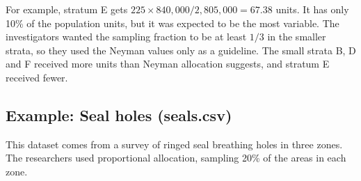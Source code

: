 \documentclass[
  letterpaper,
  DIV=11,
  numbers=noendperiod]{scrreprt}
\newenvironment{Shaded}{\begin{snugshade}}{\end{snugshade}}
\newcommand{\AttributeTok}[1]{\textcolor[rgb]{0.40,0.45,0.13}{#1}}
\newcommand{\CommentTok}[1]{\textcolor[rgb]{0.37,0.37,0.37}{#1}}
\newcommand{\DecValTok}[1]{\textcolor[rgb]{0.68,0.00,0.00}{#1}}
\newcommand{\DocumentationTok}[1]{\textcolor[rgb]{0.37,0.37,0.37}{\textit{#1}}}
\newcommand{\FunctionTok}[1]{\textcolor[rgb]{0.28,0.35,0.67}{#1}}
\newcommand{\NormalTok}[1]{\textcolor[rgb]{0.00,0.23,0.31}{#1}}
\newcommand{\OtherTok}[1]{\textcolor[rgb]{0.00,0.23,0.31}{#1}}
\newcommand{\SpecialCharTok}[1]{\textcolor[rgb]{0.37,0.37,0.37}{#1}}
\newcommand{\StringTok}[1]{\textcolor[rgb]{0.13,0.47,0.30}{#1}}
\renewcommand{\[}{\begin{equation}}
\renewcommand{\]}{\end{equation}}
\begin{document}
For example, stratum E gets
\(225 \times 840{,}000/2{,}805{,}000 = 67.38\) units. It has only 10\%
of the population units, but it was expected to be the most variable.
The investigators wanted the sampling fraction to be at least \(1/3\) in
the smaller strata, so they used the Neyman values only as a guideline.
The small strata B, D and F received more units than Neyman allocation
suggests, and stratum E received fewer.

\subsection{Example: Seal holes
(seals.csv)}\label{example-seal-holes-seals.csv}

This dataset comes from a survey of ringed seal breathing holes in three
zones. The researchers used proportional allocation, sampling 20\% of
the areas in each zone.

\begin{Shaded}
\end{Shaded}
\end{document}
